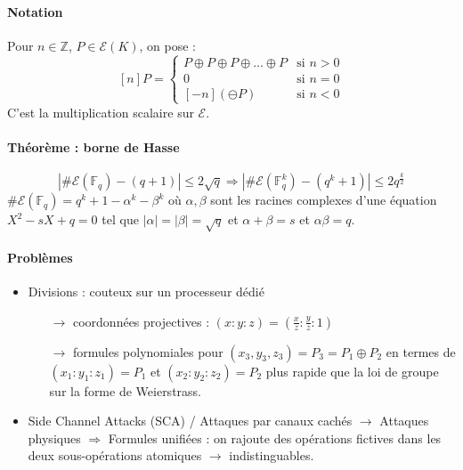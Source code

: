 \documentclass[12pt,a4paper]{report}
\begin{document}
\paragraph{Notation\\}
Pour $n \in \mathbb{Z}$, $P \in \mathcal{E}(K)$, on pose : \\
$$[n] P = \left\{
	\begin{array}{ll}
        \displaystyle  P\oplus P \oplus P \oplus \ldots \oplus P & \mbox{si } n > 0\\
        0 & \mbox{si } n=0 \\
        \displaystyle [-n](\ominus P) & \mbox{si } n < 0 
    \end{array}
\right.$$
C'est la multiplication scalaire sur $\mathcal{E}$.
\paragraph{Théorème : borne de Hasse}
$$ \left| \# \mathcal{E}(\mathbb{F}_q)-(q+1) \right| \leqslant 2\sqrt{q} \Longrightarrow \left| \# \mathcal{E}(\mathbb{F}_q^k)-(q^k+1) \right| \leqslant 2 q^{\frac{k}{2}} $$
$ \# \mathcal{E}(\mathbb{F}_q) = q^k + 1 - \alpha^k - \beta^k $ où $\alpha, \beta $ sont les racines complexes d'une équation $X^2 -sX + q =0 $ tel que $ |\alpha | = |\beta | = \sqrt{q} $ et $\alpha + \beta = s $ et $ \alpha \beta =q$.

\paragraph{Problèmes\\}
\begin{itemize}
\item Divisions : couteux sur un processeur dédié
\begin{itemize}
\item[$\rightarrow$] coordonnées projectives : $ (x:y:z) = (\frac{x}{z}:\frac{y}{z}:1)$
\item[$\rightarrow$] formules polynomiales pour $(x_3,y_3,z_3)=P_3=P_1\oplus P_2$ en termes de $(x_1:y_1:z_1) = P_1 $ et $(x_2:y_2:z_2)=P_2$ plus rapide que la loi de groupe sur la forme de Weierstrass.
\end{itemize}
\item Side Channel Attacks (SCA) / Attaques par canaux cachés $ \rightarrow $ Attaques physiques $\Longrightarrow$ 
Formules unifiées : on rajoute des opérations fictives dans les deux sous-opérations atomiques $ \longrightarrow $ indistinguables.
\end{itemize}
\end{document}

